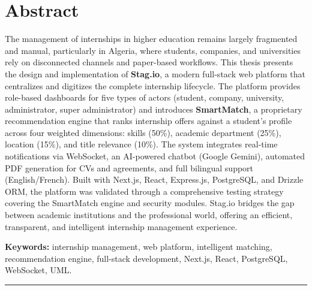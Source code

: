 
\chapter*{Abstract}

\vspace{0.3cm}

The management of internships in higher education remains largely fragmented and manual, particularly in Algeria, where students, companies, and universities rely on disconnected channels and paper-based workflows. This thesis presents the design and implementation of \textbf{Stag.io}, a modern full-stack web platform that centralizes and digitizes the complete internship lifecycle. The platform provides role-based dashboards for five types of actors (student, company, university, administrator, super administrator) and introduces \textbf{SmartMatch}, a proprietary recommendation engine that ranks internship offers against a student's profile across four weighted dimensions: skills (50\%), academic department (25\%), location (15\%), and title relevance (10\%). The system integrates real-time notifications via WebSocket, an AI-powered chatbot (Google Gemini), automated PDF generation for CVs and agreements, and full bilingual support (English/French). Built with Next.js, React, Express.js, PostgreSQL, and Drizzle ORM, the platform was validated through a comprehensive testing strategy covering the SmartMatch engine and security modules. Stag.io bridges the gap between academic institutions and the professional world, offering an efficient, transparent, and intelligent internship management experience.

\vspace{0.8cm}

\textbf{Keywords:} internship management, web platform, intelligent matching, recommendation engine, full-stack development, Next.js, React, PostgreSQL, WebSocket, UML.

\vspace{1.5cm}

\begin{center}
\rule{8cm}{0.5pt}
\end{center}

\vspace{0.5cm}


